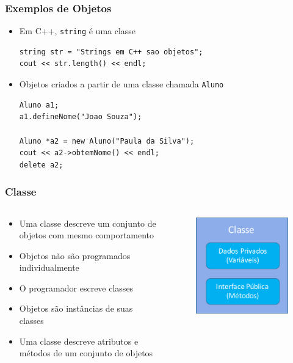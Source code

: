 \documentclass[aspectratio=169]{beamer}
\begin{document}
\begin{frame}[fragile]\frametitle{Exemplos de Objetos}
\begin{itemize}
	\item Em C++, \texttt{string} é uma classe
\begin{lstlisting}
string str = "Strings em C++ sao objetos";
cout << str.length() << endl;
\end{lstlisting}
	\item Objetos criados a partir de uma classe chamada \texttt{Aluno}
\begin{lstlisting}
Aluno a1;
a1.defineNome("Joao Souza");

Aluno *a2 = new Aluno("Paula da Silva");
cout << a2->obtemNome() << endl;
delete a2;
\end{lstlisting}
\end{itemize}
\end{frame}

\begin{frame}\frametitle{Classe}
\begin{columns}[T]
\begin{column}{0.5\linewidth}
\begin{itemize}
	\item Uma classe descreve um conjunto de objetos com mesmo comportamento
	\item Objetos não são programados individualmente
	\item O programador escreve classes
	\item Objetos são instâncias de suas classes
	\item Uma classe descreve atributos e métodos de um conjunto de objetos
\end{itemize}
\end{column}
\begin{column}{0.5\linewidth}
\begin{figure}[h]
	\centering
	\includegraphics[height=0.45\paperheight]{pucrs-ec-poo-unidade_04-classes_e_objetos-laminas-classe.png}
\end{figure}
\end{column}
\end{columns}
\end{frame}
\end{document}
